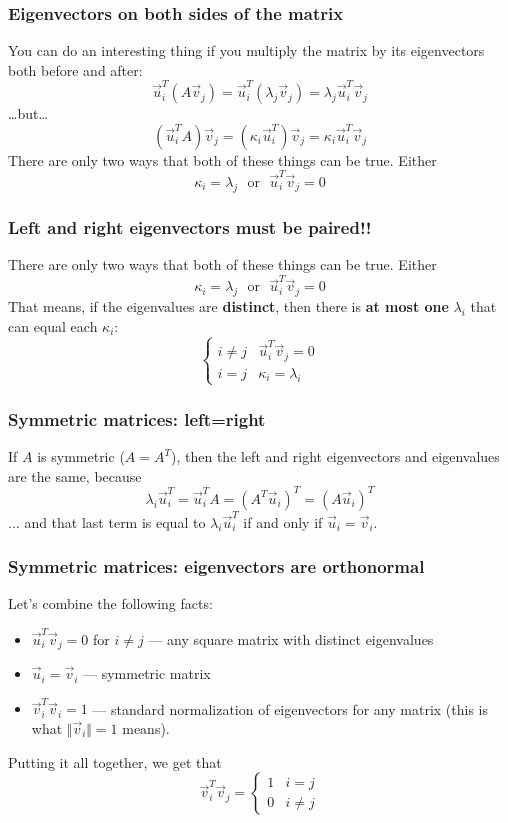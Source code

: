 \documentclass{beamer}
\begin{document}
\begin{frame}
  \frametitle{Eigenvectors on both sides of the matrix}
  You can do an interesting thing if you multiply the matrix by its eigenvectors both before and after:
  \[
  \vec{u}_i^T(A\vec{v}_j)=\vec{u}_i^T(\lambda_j\vec{v}_j)=\lambda_j\vec{u}_i^T\vec{v}_j
  \]
  \ldots but\ldots
  \[
  (\vec{u}_i^TA)\vec{v}_j=(\kappa_i\vec{u}_i^T)\vec{v}_j=\kappa_i\vec{u}_i^T\vec{v}_j
  \]
  There are only two ways that both of these things can be true. Either
  \[
  \kappa_i=\lambda_j~~~\mbox{or}~~~\vec{u}_i^T\vec{v}_j=0
  \]
\end{frame}

\begin{frame}
  \frametitle{Left and right eigenvectors must be paired!!}
  There are only two ways that both of these things can be true. Either
  \[
  \kappa_i=\lambda_j~~~\mbox{or}~~~\vec{u}_i^T\vec{v}_j=0
  \]
  That means, if the eigenvalues are {\bf distinct}, then there is
  {\bf at most one} $\lambda_i$ that can equal each $\kappa_i$:
  \[
  \begin{cases}
    i\ne j & \vec{u}_i^T\vec{v}_j = 0\\
    i=j & \kappa_i = \lambda_i
  \end{cases}
  \]
\end{frame}

\begin{frame}
  \frametitle{Symmetric matrices: left=right}

  If $A$ is symmetric ($A=A^T$), then the left and right eigenvectors
  and eigenvalues are the same, because
  \[
  \lambda_i\vec{u}_i^T=\vec{u}_i^TA=(A^T\vec{u}_i)^T=(A\vec{u}_i)^T
  \]
  $\ldots$ and that last term is equal to $\lambda_i\vec{u}_i^T$ if and
  only if $\vec{u}_i=\vec{v}_i$.
\end{frame}

\begin{frame}
  \frametitle{Symmetric matrices: eigenvectors are orthonormal}
  Let's combine the following facts:
  \begin{itemize}
  \item $\vec{u}_i^T\vec{v}_j=0$ for $i\ne j$ --- any square matrix with distinct
    eigenvalues
  \item $\vec{u}_i=\vec{v}_i$ --- symmetric matrix
  \item $\vec{v}_i^T\vec{v}_i=1$ --- standard normalization of
    eigenvectors for any matrix (this is what $\Vert\vec{v}_i\Vert=1$ means).
  \end{itemize}
  Putting it all together, we get that
  \[
  \vec{v}_i^T\vec{v}_j=
  \begin{cases}
    1&i=j\\
    0&i\ne j
  \end{cases}
  \]
\end{frame}
\end{document}
